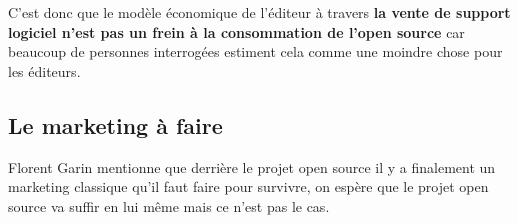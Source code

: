 			C'est donc que le modèle économique de l'éditeur à travers \textbf{la vente de support logiciel n'est pas un frein à la consommation de l'open source} car beaucoup de personnes interrogées estiment cela comme une moindre chose pour les éditeurs.

		\subsection{Le marketing à faire}

			Florent Garin mentionne que derrière le projet open source il y a finalement un marketing classique qu'il faut faire pour survivre, on espère que le projet open source va suffir en lui même mais ce n'est pas le cas.









